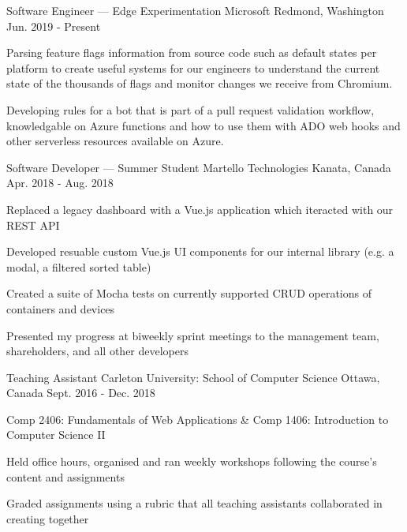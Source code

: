 
\begin{cventries}
	\cventry
		{Software Engineer --- Edge Experimentation}
		{Microsoft}
		{Redmond, Washington}
		{Jun. 2019 - Present}
		{\begin{cvitems}
			\item Parsing feature flags information from source code such as default states per platform to create useful systems for our engineers to understand the current state of the thousands of flags and monitor changes we receive from Chromium.
			\item Developing rules for a bot that is part of a pull request validation workflow, knowledgable on Azure functions and how to use them with ADO web hooks and other serverless resources available on Azure.
		\end{cvitems}}

	\cventry
		{Software Developer --- Summer Student}
		{Martello Technologies}
		{Kanata, Canada}
		{Apr. 2018 - Aug. 2018}
		{\begin{cvitems}
			\item Replaced a legacy dashboard with a Vue.js application which iteracted with our REST API
			\item Developed resuable custom Vue.js UI components for our internal library (e.g. a modal, a filtered sorted table)
			\item Created a suite of Mocha tests on currently supported CRUD operations of containers and devices
			\item Presented my progress at biweekly sprint meetings to the management team, shareholders, and all other developers
		\end{cvitems}}

	\cventry
		{Teaching Assistant}
		{Carleton University: School of Computer Science}
		{Ottawa, Canada}
		{Sept. 2016 - Dec. 2018}
		{\begin{cvitems}
			\item Comp 2406: Fundamentals of Web Applications \& Comp 1406: Introduction to Computer Science II
			\item Held office hours, organised and ran weekly workshops following the course's content and assignments
			\item Graded assignments using a rubric that all teaching assistants collaborated in creating together
		\end{cvitems}}
\end{cventries}
